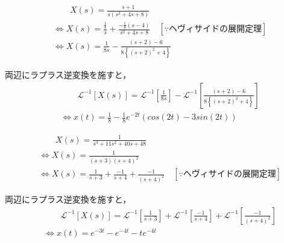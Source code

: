 \documentclass[a4paper,12pt]{article}
\begin{document}
\begin{tcolorbox}[title={ [16] (4) \( X(s)=\frac{ s + 1 }{ s ( s^2 + 4s + 8 ) } \)}]
  \vspace{-3mm}
\begin{align*}
    &\qquad X(s) =\frac{ s + 1 }{ s ( s^2 + 4s + 8 ) }  \\
    &\Leftrightarrow X(s) 
    = \frac{ \frac{1}{8} }{s}
    +\frac{ -\frac{1}{8}(s-4) }{ s^2 + 4s + 8 } 
    \quad [\because ヘヴィサイドの展開定理]\\
    &\Leftrightarrow X(s) 
    =\frac{1}{8s}
    -\frac{ (s+2)-6}{8\left\{(s+2)^2 + 4 \right\}}
\end{align*}

\quad 両辺にラプラス逆変換を施すと，
\vspace{-3mm}
\begin{align*}
    &\qquad \mathcal{L}^{-1} \left[ X(s) \right] 
    =\mathcal{L}^{-1} \left[ \frac{1}{8s} \right]
    -\mathcal{L}^{-1} \left[ \frac{ (s+2)-6}{8\left\{(s+2)^2 + 4 \right\}} \right] \\
    &\Leftrightarrow x(t) = \frac{1}{8} - \frac{1}{8}e^{-2t}(cos(2t)-3sin(2t))
\end{align*}
\end{tcolorbox}
\begin{tcolorbox}[title={ [16] (5) \( X(s)=\frac{ 1 }{ s^3 + 11 s^2+ 40s + 48 } \) }]
  \vspace{-3mm}
\begin{align*}
    &\qquad X(s) =\frac{ 1 }{ s^3 + 11 s^2+ 40s + 48 }  \\
    &\Leftrightarrow X(s) =\frac{ 1 }{ (s+3)(s+4)^2 }  \\
    &\Leftrightarrow X(s) 
    = \frac{1}{s+3}
    + \frac{-1}{s + 4}
    + \frac{-1}{(s + 4)^2}
    \quad [\because ヘヴィサイドの展開定理]
\end{align*}

\quad 両辺にラプラス逆変換を施すと，
\vspace{-3mm}
\begin{align*}
    &\qquad \mathcal{L}^{-1} \left[ X(s) \right] 
    =\mathcal{L}^{-1} \left[ \frac{1}{s+3} \right]
    +\mathcal{L}^{-1} \left[ \frac{-1}{s + 4} \right]
    +\mathcal{L}^{-1} \left[ \frac{-1}{(s + 4)^2} \right] \\
    &\Leftrightarrow x(t) = e^{-3t} - e^{-4t} - te^{-4t}
\end{align*}
\end{tcolorbox}
\end{document}
